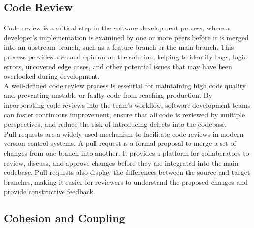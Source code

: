 \subsection{Code Review}

Code review is a critical step in the software development process, where a developer's implementation is examined by one or more peers before it is merged into an upstream branch, such as a feature branch or the main branch. This process provides a second opinion on the solution, helping to identify bugs, logic errors, uncovered edge cases, and other potential issues that may have been overlooked during development. \cite{gitlab:code-review} \\

A well-defined code review process is essential for maintaining high code quality and preventing unstable or faulty code from reaching production. By incorporating code reviews into the team's workflow, software development teams can foster continuous improvement, ensure that all code is reviewed by multiple perspectives, and reduce the risk of introducing defects into the codebase. \cite{gitlab:code-review} \\

Pull requests are a widely used mechanism to facilitate code reviews in modern version control systems. A pull request is a formal proposal to merge a set of changes from one branch into another. It provides a platform for collaborators to review, discuss, and approve changes before they are integrated into the main codebase. Pull requests also display the differences between the source and target branches, making it easier for reviewers to understand the proposed changes and provide constructive feedback. \cite{github:pr}

\subsection{Cohesion and Coupling}



